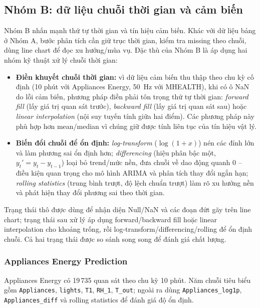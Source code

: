 \subsection{Nhóm B: dữ liệu chuỗi thời gian và cảm biến}

Nhóm B nhấn mạnh thứ tự thời gian và tín hiệu cảm biến. Khác với dữ liệu bảng ở Nhóm A, bước phân tích cần giữ trục thời gian, kiểm tra missing theo chuỗi, dùng line chart để đọc xu hướng/mùa vụ. Đặc thù của Nhóm B là áp dụng hai nhóm kỹ thuật xử lý chuỗi thời gian:

\begin{itemize}[leftmargin=*]
    \item \textbf{Điền khuyết chuỗi thời gian:} vì dữ liệu cảm biến thu thập theo chu kỳ cố định (10 phút với Appliances Energy, 50~Hz với MHEALTH), khi có ô NaN do lỗi cảm biến, phương pháp điền phải tôn trọng thứ tự thời gian: \emph{forward fill} (lấy giá trị quan sát trước), \emph{backward fill} (lấy giá trị quan sát sau) hoặc \emph{linear interpolation} (nội suy tuyến tính giữa hai điểm). Các phương pháp này phù hợp hơn mean/median vì chúng giữ được tính liên tục của tín hiệu vật lý.
    \item \textbf{Biến đổi chuỗi để ổn định:} \emph{log-transform} ($\log(1+x)$) nén các đỉnh lớn và làm phương sai ổn định hơn; \emph{differencing} (hiệu phân bậc một, $y_t' = y_t - y_{t-1}$) loại bỏ trend/mức nền, đưa chuỗi về dao động quanh 0 -- điều kiện quan trọng cho mô hình ARIMA và phân tích thay đổi ngắn hạn; \emph{rolling statistics} (trung bình trượt, độ lệch chuẩn trượt) làm rõ xu hướng nền và phát hiện thay đổi phương sai theo thời gian.
\end{itemize}

Trạng thái thô được dùng để nhận diện Null/NaN và các đoạn đứt gãy trên line chart; trạng thái sau xử lý áp dụng forward/backward fill hoặc linear interpolation cho khoảng trống, rồi log-transform/differencing/rolling để ổn định chuỗi. Cả hai trạng thái được so sánh song song để đánh giá chất lượng.

\subsubsection{Appliances Energy Prediction}

Appliances Energy có 19\,735 quan sát theo chu kỳ 10 phút. Năm chuỗi tiêu biểu gồm \texttt{Appliances}, \texttt{lights}, \texttt{T1}, \texttt{RH\_1}, \texttt{T\_out}; ngoài ra dùng \texttt{Appliances\_log1p}, \texttt{Appliances\_diff} và rolling statistics để đánh giá độ ổn định.

